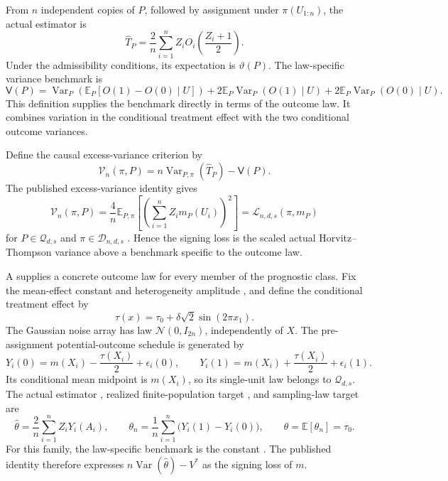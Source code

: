 \documentclass[11pt]{article}
\begin{document}
From \(n\) independent copies of \(P\), followed by assignment under \(\pi(U_{1:n})\), the actual estimator is
\[
\widehat T_P
=
\frac2n\sum_{i=1}^n Z_i
O_i\!\left(\frac{Z_i+1}{2}\right).
\]
Under the admissibility conditions, its expectation is \(\vartheta(P)\). The law-specific variance benchmark is
\[
\mathsf V(P)
=
\operatorname{Var}_P\!\left(
\mathbb E_P[O(1)-O(0)\mid U]
\right)
+
2\mathbb E_P\operatorname{Var}_P(O(1)\mid U)
+
2\mathbb E_P\operatorname{Var}_P(O(0)\mid U).
\]
This definition supplies the benchmark directly in terms of the outcome law. It combines variation in the conditional treatment effect with the two conditional outcome variances.

Define the causal excess-variance criterion by
\[
\mathcal V_n(\pi,P)
=
n\operatorname{Var}_{P,\pi}(\widehat T_P)-\mathsf V(P).
\]
The published excess-variance identity gives
\[
\mathcal V_n(\pi,P)
=
\frac4n\mathbb E_{P,\pi}
\left[
\left(\sum_{i=1}^n Z_i m_P(U_i)\right)^2
\right]
=
\mathcal L_{n,d,s}(\pi,m_P)
\]
for \(P\in\mathcal Q_{d,s}\) and \(\pi\in\mathcal D_{n,d,s}\)
\citep[Proposition 2.3, equation (2.4), under Assumption 2.1 and Definition 2.2]{Cytrynbaum2026Limits}.
Hence the signing loss is the scaled actual Horvitz--Thompson variance above a benchmark specific to the outcome law.

A  supplies a concrete outcome law for every member of the prognostic class. Fix the mean-effect constant  and heterogeneity amplitude , and define the conditional treatment effect  by
\[
\tau(x)=\tau_0+\delta\sqrt2\sin(2\pi x_1).
\]
The Gaussian noise array  has law \(\mathcal N(0,I_{2n})\), independently of \(X\). The pre-assignment potential-outcome schedule  is generated by
\[
Y_i(0)=m(X_i)-\frac{\tau(X_i)}2+\epsilon_i(0),
\qquad
Y_i(1)=m(X_i)+\frac{\tau(X_i)}2+\epsilon_i(1).
\]
Its conditional mean midpoint is \(m(X_i)\), so its single-unit law belongs to \(\mathcal Q_{d,s}\). The actual estimator , realized finite-population target , and sampling-law target  are
\[
\widehat\theta
=
\frac2n\sum_{i=1}^n Z_iY_i(A_i),
\qquad
\theta_n
=
\frac1n\sum_{i=1}^n\bigl(Y_i(1)-Y_i(0)\bigr),
\qquad
\theta=\mathbb E[\theta_n]=\tau_0.
\]
For this family, the law-specific benchmark is the constant . The published identity therefore expresses \(n\operatorname{Var}(\widehat\theta)-V^*\) as the signing loss of \(m\).
\end{document}
